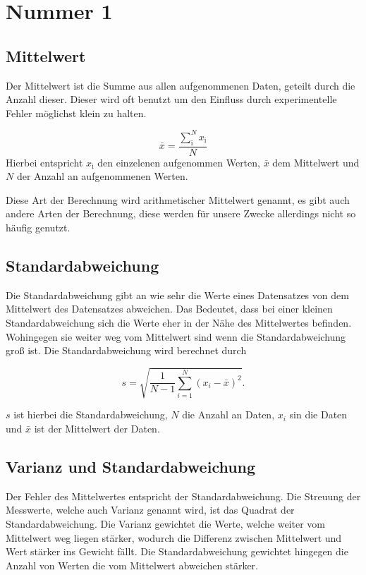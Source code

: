 \section{Nummer 1}
\label{sec:nummer1}

\subsection{Mittelwert}
Der Mittelwert ist die Summe aus allen aufgenommenen Daten, geteilt durch die Anzahl dieser.
Dieser wird oft benutzt um den Einfluss durch experimentelle Fehler möglichst klein zu halten.

\begin{equation*}
    \bar x = \frac{\sum_\text{i}^N x_\text{i}}{N} 
\end{equation*}
Hierbei entspricht $x_\text{i}$ den einzelenen aufgenommen Werten, $\bar x$ dem Mittelwert und $N$ der Anzahl an aufgenommenen Werten.

Diese Art der Berechnung wird arithmetischer Mittelwert genannt,
 es gibt auch andere Arten der Berechnung, 
 diese werden für unsere Zwecke allerdings nicht so häufig genutzt.

\subsection{Standardabweichung}

Die Standardabweichung gibt an wie sehr die Werte eines Datensatzes von dem Mittelwert des Datensatzes abweichen.
Das Bedeutet, dass bei einer kleinen Standardabweichung sich die Werte eher in der Nähe des Mittelwertes befinden.
Wohingegen sie weiter weg vom Mittelwert sind wenn die Standardabweichung groß ist.
Die Standardabweichung wird berechnet durch

\begin{equation*}
    s = \sqrt{\frac{1}{N-1} \sum _{i=1}^N(x_i -\bar x)^2}.
\end{equation*}

$s$ ist hierbei die Standardabweichung, $N$ die Anzahl an Daten, $x_i$ sin die Daten und $\bar x$ ist der Mittelwert der Daten.

\subsection{Varianz und Standardabweichung}

Der Fehler des Mittelwertes entspricht der Standardabweichung.
Die Streuung der Messwerte, welche auch Varianz genannt wird, ist das Quadrat der Standardabweichung.
Die Varianz gewichtet die Werte, welche weiter vom Mittelwert weg liegen stärker, wodurch die Differenz zwischen Mittelwert und Wert stärker ins Gewicht fällt.
Die Standardabweichung gewichtet hingegen die Anzahl von Werten die vom Mittelwert abweichen stärker.

